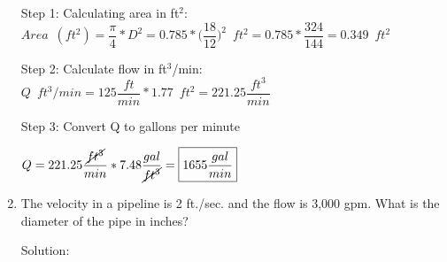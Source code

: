 \documentclass{article}
\begin{document}
\begin{enumerate}
\vspace{0.2cm}
Step 1:  Calculating area in ft${^2}$:\\
\vspace{0.2cm}
$Area \enspace (ft^2)= \dfrac{\pi}{4}*D^2= 0.785*\Big(\dfrac{18}{12}\Big)^2 \enspace ft^2=0.785*\dfrac{324}{144}=0.349 \enspace ft^2$\\
\vspace{0.2cm}

Step 2: Calculate flow in ft$^3$/min:\\

$ Q \enspace ft^3/min = 125 \dfrac{ft}{min}*1.77 \enspace ft^2 = 221.25 \dfrac{ft^3}{min}$\\

\vspace{0.2cm}

Step 3: Convert Q to gallons per minute

\vspace{0.2cm}

$Q=221.25 \dfrac{\cancel{ft^3}}{min}*7.48\dfrac{gal}{\cancel{ft^3}}=\boxed{1655 \dfrac{gal}{min}}$


\item The velocity in a pipeline is 2 ft./sec. and the flow is 3,000 gpm. What is the diameter of the pipe in inches?

Solution:\\
\vspace{0.2cm}


\end{enumerate}
\end{document}
